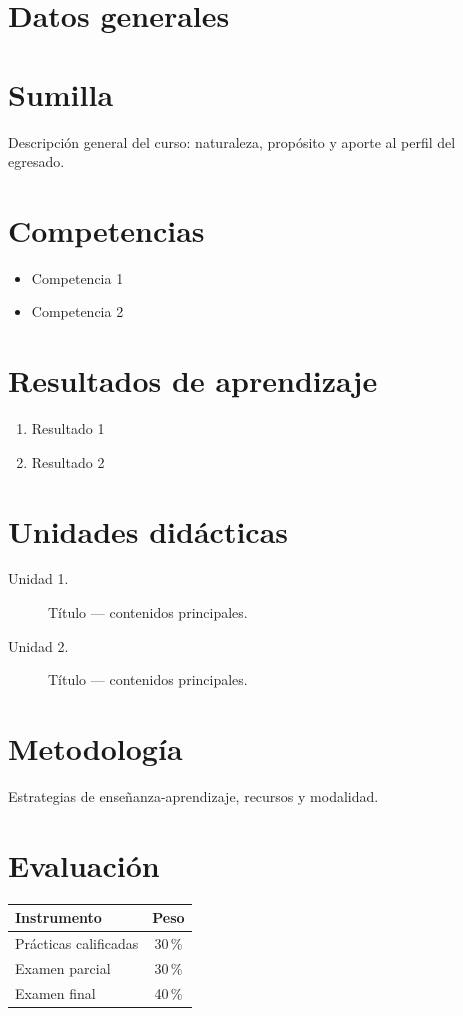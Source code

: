 \documentclass{academic-report}
\begin{document}
\encabezado

\section{Datos generales}

\section{Sumilla}
Descripción general del curso: naturaleza, propósito y aporte al perfil del egresado.

\section{Competencias}
\begin{itemize}
  \item Competencia 1
  \item Competencia 2
\end{itemize}

\section{Resultados de aprendizaje}
\begin{enumerate}
  \item Resultado 1
  \item Resultado 2
\end{enumerate}

\section{Unidades didácticas}
\begin{description}
  \item[Unidad 1.] Título — contenidos principales.
  \item[Unidad 2.] Título — contenidos principales.
\end{description}

\section{Metodología}
Estrategias de enseñanza-aprendizaje, recursos y modalidad.

\section{Evaluación}
\noindent\begin{tabularx}{\linewidth}{Xc}
\toprule \textbf{Instrumento} & \textbf{Peso} \\\midrule
Prácticas calificadas & 30\,\% \\
Examen parcial & 30\,\% \\
Examen final & 40\,\% \\\bottomrule
\end{tabularx}
\end{document}

